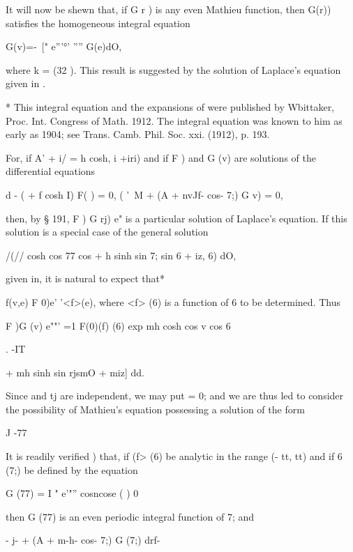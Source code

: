 
It will now be shewn that, if G r ) is any even Mathieu function, then
G(r)) satisfies the homogeneous integral equation

G(v)=-\ [" e'''°' '''' G(e)dO,

where k = \/(32 ). This result is suggested by the solution of
Laplace's equation given in .

* This integral equation and the expansions of were published
by Wbittaker, Proc. Int. Congress of Math. 1912. The integral equation
was known to him as early as 1904; see Trans. Camb. Phil. Soc. xxi.
(1912), p. 193.

%
%

For, if A' + i/ = h cosh, i +iri) and if F ) and G (v) are solutions
of the differential equations

 d - ( + f cosh I) F( ) = 0, ( '\ M + (A + nvJf- cos- 7;) G v) = 0,

then, by § 191, F ) G rj) e" is a particular solution of Laplace's
equation. If this solution is a special case of the general solution

/(// cosh cos 77 cos + h sinh sin 7; sin 6 + iz, 6) dO,

given in, it is natural to expect that*

f(v,e) F 0)e' '<f>(e), where <f> (6) is a function of 6 to be
determined. Thus

F )G (v) e""' =1 F(0)(f) (6) exp mh cosh cos v cos 6

. -IT

+ mh sinh sin rjsmO + miz] dd.

Since and tj are independent, we may put = 0; and we are thus led to
consider the possibility of Mathieu's equation possessing a solution
of the form

J -77


It is readily verified ) that, if (f> (6) be analytic in the
range (- tt, tt) and if 6 (7;) be defined by the equation

G (77) = I " e'"'' cosncose ( ) 0

then G (77) is an even periodic integral function of 7; and

- j- + (A + m-h- cos- 7;) G (7;) drf-


